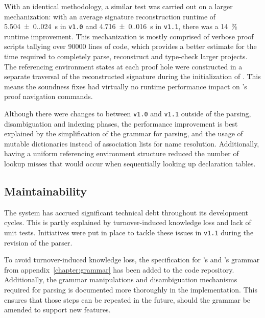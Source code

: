 With an identical methodology, a similar test was carried out on a larger mechanization: with an average signature reconstruction runtime of \SI{5.504(0.024)}{\second} in \texttt{v1.0} and \SI{4.716(0.016)}{\second} in \texttt{v1.1}, there was a \SI{14}{\percent} runtime improvement.
This mechanization is mostly comprised of verbose \Harpoon proof scripts tallying over \num{90000} lines of code, which provides a better estimate for the time required to completely parse, reconstruct and type-check larger projects.
The referencing environment states at each proof hole were constructed in a separate traversal of the reconstructed \Beluga signature during the initialization of \Harpoon.
This means the soundness fixes had virtually no runtime performance impact on \Harpoon's proof navigation commands.

Although there were changes to \Beluga between \texttt{v1.0} and \texttt{v1.1} outside of the parsing, disambiguation and indexing phases, the performance improvement is best explained by the simplification of the grammar for parsing, and the usage of mutable dictionaries instead of association lists for name resolution.
Additionally, having a uniform referencing environment structure reduced the number of lookup misses that would occur when sequentially looking up declaration tables.

\subsection*{Maintainability}


The \Beluga system has accrued significant technical debt throughout its development cycles.
This is partly explained by turnover-induced knowledge loss and lack of unit tests.
Initiatives were put in place to tackle these issues in \texttt{v1.1} during the revision of the parser.


To avoid turnover-induced knowledge loss, the specification for \Beluga's and \Harpoon's grammar from appendix~\ref{chapter:grammar} has been added to the code repository.
Additionally, the grammar manipulations and disambiguation mechanisms required for parsing is documented more thoroughly in the implementation.
This ensures that those steps can be repeated in the future, should the grammar be amended to support new features.

